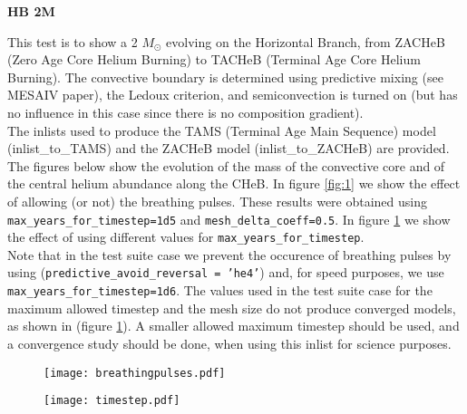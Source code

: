 \documentclass{article}
\begin{document}
\begin{center}
\begin{Large}
\textbf{HB 2M}\\
\end{Large}
\end{center}

This test is to show a 2 $M_\odot$ evolving on the Horizontal Branch, from ZACHeB (Zero Age Core Helium Burning) to TACHeB (Terminal Age Core Helium Burning). The convective boundary is determined using predictive mixing (see MESAIV paper), the Ledoux criterion, and semiconvection is turned on (but has no influence in this case since there is no composition gradient).\\

The inlists used to produce the TAMS (Terminal Age Main Sequence) model (inlist\_to\_TAMS) and the ZACHeB model (inlist\_to\_ZACHeB) are provided.\\

The figures below show the evolution of the mass of the convective core and of the central helium abundance along the CHeB. In  figure \ref{fig:1} we show the effect of allowing (or not) the breathing pulses. These results were obtained using \texttt{max\_years\_for\_timestep=1d5} and \texttt{mesh\_delta\_coeff=0.5}.  In figure \ref{fig:2} we show the effect of using different values for \texttt{max\_years\_for\_timestep}. \\

Note that in the test suite case we prevent the occurence of breathing pulses by using (\texttt{predictive\_avoid\_reversal = 'he4'}) and, for speed purposes, we use \texttt{max\_years\_for\_timestep=1d6}. The values used in the test suite case for the maximum allowed timestep and the mesh size do not produce converged models, as shown in (figure \ref{fig:2}). A smaller allowed maximum timestep should be used, and a convergence study should be done, when using this inlist for science purposes.\\

\begin{figure}[H]
\begin{minipage}[b]{0.5\linewidth}
\centering
\texttt{[image: breathingpulses.pdf]}
\caption{}
\label{fig:1}
\end{minipage}
\hspace{0cm}
\begin{minipage}[b]{0.5\linewidth}
\centering
\texttt{[image: timestep.pdf]}
\caption{}
\label{fig:2}
\end{minipage}
\end{figure}

\pagebreak
\end{document}
